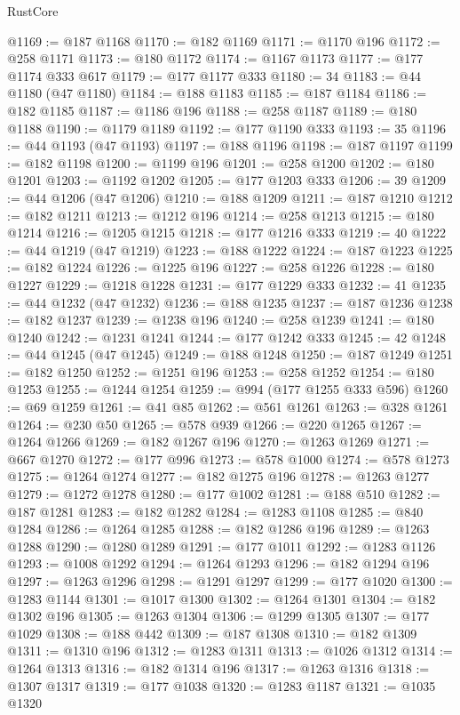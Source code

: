 \begin{lexlean}{RustCore}
\begin{coremodule}
@1169 := @187 @1168
@1170 := @182 @1169
@1171 := @1170 @196
@1172 := @258 @1171
@1173 := @180 @1172
@1174 := @1167 @1173
@1177 := @177 @1174 @333 @617
@1179 := @177 @1177 @333
@1180 := 34
@1183 := @44 @1180 (@47 @1180)
@1184 := @188 @1183
@1185 := @187 @1184
@1186 := @182 @1185
@1187 := @1186 @196
@1188 := @258 @1187
@1189 := @180 @1188
@1190 := @1179 @1189
@1192 := @177 @1190 @333
@1193 := 35
@1196 := @44 @1193 (@47 @1193)
@1197 := @188 @1196
@1198 := @187 @1197
@1199 := @182 @1198
@1200 := @1199 @196
@1201 := @258 @1200
@1202 := @180 @1201
@1203 := @1192 @1202
@1205 := @177 @1203 @333
@1206 := 39
@1209 := @44 @1206 (@47 @1206)
@1210 := @188 @1209
@1211 := @187 @1210
@1212 := @182 @1211
@1213 := @1212 @196
@1214 := @258 @1213
@1215 := @180 @1214
@1216 := @1205 @1215
@1218 := @177 @1216 @333
@1219 := 40
@1222 := @44 @1219 (@47 @1219)
@1223 := @188 @1222
@1224 := @187 @1223
@1225 := @182 @1224
@1226 := @1225 @196
@1227 := @258 @1226
@1228 := @180 @1227
@1229 := @1218 @1228
@1231 := @177 @1229 @333
@1232 := 41
@1235 := @44 @1232 (@47 @1232)
@1236 := @188 @1235
@1237 := @187 @1236
@1238 := @182 @1237
@1239 := @1238 @196
@1240 := @258 @1239
@1241 := @180 @1240
@1242 := @1231 @1241
@1244 := @177 @1242 @333
@1245 := 42
@1248 := @44 @1245 (@47 @1245)
@1249 := @188 @1248
@1250 := @187 @1249
@1251 := @182 @1250
@1252 := @1251 @196
@1253 := @258 @1252
@1254 := @180 @1253
@1255 := @1244 @1254
@1259 := @994 (@177 @1255 @333 @596)
@1260 := @69 @1259
@1261 := @41 @85
@1262 := @561 @1261
@1263 := @328 @1261
@1264 := @230 @50
@1265 := @578 @939
@1266 := @220 @1265
@1267 := @1264 @1266
@1269 := @182 @1267 @196
@1270 := @1263 @1269
@1271 := @667 @1270
@1272 := @177 @996
@1273 := @578 @1000
@1274 := @578 @1273
@1275 := @1264 @1274
@1277 := @182 @1275 @196
@1278 := @1263 @1277
@1279 := @1272 @1278
@1280 := @177 @1002
@1281 := @188 @510
@1282 := @187 @1281
@1283 := @182 @1282
@1284 := @1283 @1108
@1285 := @840 @1284
@1286 := @1264 @1285
@1288 := @182 @1286 @196
@1289 := @1263 @1288
@1290 := @1280 @1289
@1291 := @177 @1011
@1292 := @1283 @1126
@1293 := @1008 @1292
@1294 := @1264 @1293
@1296 := @182 @1294 @196
@1297 := @1263 @1296
@1298 := @1291 @1297
@1299 := @177 @1020
@1300 := @1283 @1144
@1301 := @1017 @1300
@1302 := @1264 @1301
@1304 := @182 @1302 @196
@1305 := @1263 @1304
@1306 := @1299 @1305
@1307 := @177 @1029
@1308 := @188 @442
@1309 := @187 @1308
@1310 := @182 @1309
@1311 := @1310 @196
@1312 := @1283 @1311
@1313 := @1026 @1312
@1314 := @1264 @1313
@1316 := @182 @1314 @196
@1317 := @1263 @1316
@1318 := @1307 @1317
@1319 := @177 @1038
@1320 := @1283 @1187
@1321 := @1035 @1320

\end{coremodule}
\end{lexlean}
